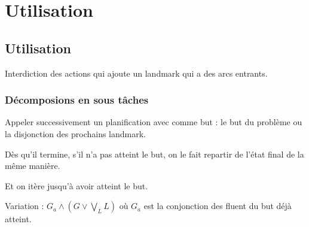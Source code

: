 \section{Utilisation}
  \subsection*{Utilisation}

\begin{frame}

  \begin{block}{}
    Interdiction des actions qui ajoute un landmark qui a des arcs entrants.
    
  \end{block}

\end{frame}

\begin{frame}
  \frametitle{Décomposions en sous tâches}

  \begin{block}{}
    Appeler successivement un planification avec comme but : le but du problème ou la disjonction des prochains landmark.

    Dès qu'il termine, s'il n'a pas atteint le but, on le fait repartir de l'état final de la même manière.

    Et on itère jusqu'à avoir atteint le but.

    
  \end{block}

  \begin{block}{}
    Variation : $G_a \wedge (G \vee \bigvee_{L} L)$ où $G_a$ est la conjonction des fluent du but déjà atteint.  
  \end{block}
\end{frame}

